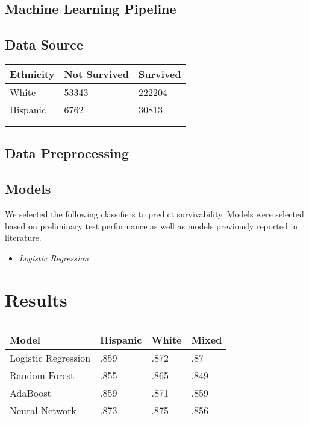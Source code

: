 \documentclass[review]{elsarticle}
\begin{document}
\subsection*{Machine Learning Pipeline}

\subsection*{Data Source}
\begin{table}[H]
	\centering
	\begin{tabular}{lll}
		\textbf{Ethnicity} & \textbf{Not Survived} & \textbf{Survived}  \\ 
		\hline
		White              & 53343                 & 222204             \\
		Hispanic           & 6762                  & 30813              \\
		&                       &                    \\
		&                       &                   
	\end{tabular}
\end{table}

\subsection*{Data Preprocessing}

\subsection*{Models}
We selected the following classifiers to predict survivability. Models were selected based on preliminary test performance as well as models previously reported in literature.
\begin{itemize}
	\item \textit{Logistic Regression} 
\end{itemize}


\section{Results}

\begin{table}[H]
	\centering
	\begin{tabular}{llll}
		\textbf{Model}      & \textbf{Hispanic} & \textbf{White} & \textbf{Mixed}  \\ 
		\hline
		Logistic Regression & .859              & .872           & .87             \\
		Random Forest       & .855              & .865           & .849            \\
		AdaBoost            & .859              & .871           & .859            \\
		Neural Network       & .873              & .875           & .856           
	\end{tabular}
	\caption{}
\end{table}
\end{document}
